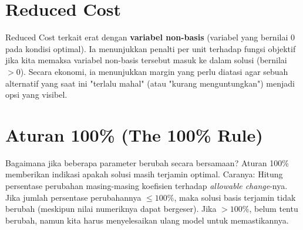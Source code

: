 \documentclass[11pt, a4paper]{article}
\begin{document}
\section{Reduced Cost}
Reduced Cost terkait erat dengan \textbf{variabel non-basis} (variabel yang bernilai 0 pada kondisi optimal). Ia menunjukkan penalti per unit terhadap fungsi objektif jika kita memaksa variabel non-basis tersebut masuk ke dalam solusi (bernilai $>0$). Secara ekonomi, ia menunjukkan margin yang perlu diatasi agar sebuah alternatif yang saat ini "terlalu mahal" (atau "kurang menguntungkan") menjadi opsi yang visibel.

\section{Aturan 100\% (The 100\% Rule)}
Bagaimana jika beberapa parameter berubah secara bersamaan? Aturan 100\% memberikan indikasi apakah solusi masih terjamin optimal.
Caranya: Hitung persentase perubahan masing-masing koefisien terhadap \textit{allowable change}-nya. Jika jumlah persentase perubahannya $\le 100\%$, maka solusi basis terjamin tidak berubah (meskipun nilai numeriknya dapat bergeser). Jika $> 100\%$, belum tentu berubah, namun kita harus menyelesaikan ulang model untuk memastikannya.
\end{document}
